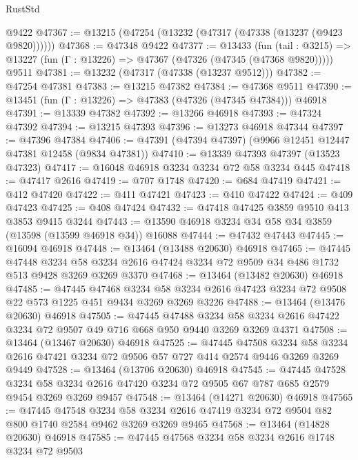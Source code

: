 \begin{lexlean}{RustStd}
\begin{coremodule}
    @9422
@47367 := @13215 (@47254 (@13232 (@47317 (@47338 (@13237 (@9423 @9820))))))
@47368 := @47348 @9422
@47377 := @13433
    (fun (tail : @3215) => @13227 (fun (Γ : @13226) => @47367 (@47326 (@47345 (@47368 @9820)))))
    @9511
@47381 := @13232 (@47317 (@47338 (@13237 @9512)))
@47382 := @47254 @47381
@47383 := @13215 @47382
@47384 := @47368 @9511
@47390 := @13451 (fun (Γ : @13226) => @47383 (@47326 (@47345 @47384))) @46918
@47391 := @13339 @47382
@47392 := @13266 @46918
@47393 := @47324 @47392
@47394 := @13215 @47393
@47396 := @13273 @46918 @47344
@47397 := @47396 @47384
@47406 := @47391 (@47394 @47397) (@9966 @12451 @12447 @47381 @12458 (@9834 @47381))
@47410 := @13339 @47393 @47397 (@13523 @47323)
@47417 := @16048 @46918 @3234 @3234 @72 @58 @3234 @445
@47418 := @47417 @2616
@47419 := @707 @1748
@47420 := @684 @47419
@47421 := @412 @47420
@47422 := @411 @47421
@47423 := @410 @47422
@47424 := @409 @47423
@47425 := @408 @47424
@47432 := @47418 @47425 @3859 @9510 @413 @3853 @9415 @3244
@47443 := @13590 @46918 @3234 @34 @58 @34 @3859 (@13598 (@13599 @46918 @34)) @16088
@47444 := @47432 @47443
@47445 := @16094 @46918
@47448 := @13464 (@13488 @20630) @46918
@47465 := @47445
    @47448
    @3234
    @58
    @3234
    @2616
    @47424
    @3234
    @72
    @9509
    @34
    @486
    @1732
    @513
    @9428
    @3269
    @3269
    @3370
@47468 := @13464 (@13482 @20630) @46918
@47485 := @47445
    @47468
    @3234
    @58
    @3234
    @2616
    @47423
    @3234
    @72
    @9508
    @22
    @573
    @1225
    @451
    @9434
    @3269
    @3269
    @3226
@47488 := @13464 (@13476 @20630) @46918
@47505 := @47445
    @47488
    @3234
    @58
    @3234
    @2616
    @47422
    @3234
    @72
    @9507
    @49
    @716
    @668
    @950
    @9440
    @3269
    @3269
    @4371
@47508 := @13464 (@13467 @20630) @46918
@47525 := @47445
    @47508
    @3234
    @58
    @3234
    @2616
    @47421
    @3234
    @72
    @9506
    @57
    @727
    @414
    @2574
    @9446
    @3269
    @3269
    @9449
@47528 := @13464 (@13706 @20630) @46918
@47545 := @47445
    @47528
    @3234
    @58
    @3234
    @2616
    @47420
    @3234
    @72
    @9505
    @67
    @787
    @685
    @2579
    @9454
    @3269
    @3269
    @9457
@47548 := @13464 (@14271 @20630) @46918
@47565 := @47445
    @47548
    @3234
    @58
    @3234
    @2616
    @47419
    @3234
    @72
    @9504
    @82
    @800
    @1740
    @2584
    @9462
    @3269
    @3269
    @9465
@47568 := @13464 (@14828 @20630) @46918
@47585 := @47445
    @47568
    @3234
    @58
    @3234
    @2616
    @1748
    @3234
    @72
    @9503

\end{coremodule}
\end{lexlean}
